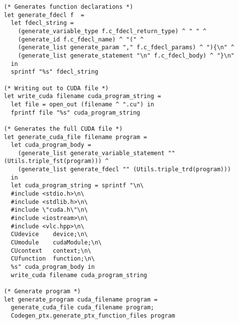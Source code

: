 \begin{verbatim}
(* Generates function declarations *)
let generate_fdecl f  =
  let fdecl_string = 
    (generate_variable_type f.c_fdecl_return_type) ^ " " ^ 
    (generate_id f.c_fdecl_name) ^ "(" ^ 
    (generate_list generate_param "," f.c_fdecl_params) ^ "){\n" ^ 
    (generate_list generate_statement "\n" f.c_fdecl_body) ^ "}\n" 
  in
  sprintf "%s" fdecl_string

(* Writing out to CUDA file *)
let write_cuda filename cuda_program_string = 
  let file = open_out (filename ^ ".cu") in 
  fprintf file "%s" cuda_program_string

(* Generates the full CUDA file *)
let generate_cuda_file filename program = 
  let cuda_program_body = 
    (generate_list generate_variable_statement "" (Utils.triple_fst(program))) ^ 
    (generate_list generate_fdecl "" (Utils.triple_trd(program))) 
  in 
  let cuda_program_string = sprintf "\n\
  #include <stdio.h>\n\
  #include <stdlib.h>\n\
  #include \"cuda.h\"\n\
  #include <iostream>\n\
  #include <vlc.hpp>\n\
  CUdevice    device;\n\
  CUmodule    cudaModule;\n\
  CUcontext   context;\n\
  CUfunction  function;\n\
  %s" cuda_program_body in
  write_cuda filename cuda_program_string

(* Generate program *)
let generate_program cuda_filename program = 
  generate_cuda_file cuda_filename program;
  Codegen_ptx.generate_ptx_function_files program
\end{verbatim}	